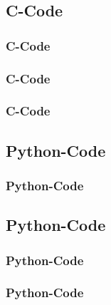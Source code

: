 \documentclass{beamer}
\theoremstyle{remark}
\numberwithin{equation}{section}
\begin{document}
\subsection{C-Code}
\begin{frame}
\frametitle{C-Code}


\end{frame}
\begin{frame}
\frametitle{C-Code}


\end{frame}
\begin{frame}
\frametitle{C-Code}


\end{frame}

\subsection{Python-Code}
\begin{frame}
\frametitle{Python-Code}

\end{frame}
\subsection{Python-Code}
\begin{frame}
\frametitle{Python-Code}

\end{frame}


\begin{frame}
\frametitle{Python-Code}

\end{frame}
\end{document}
